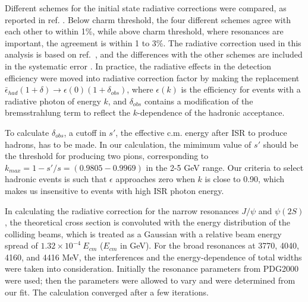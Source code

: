  
Different schemes for the initial state radiative corrections
were compared\cite{berends,fmartin,fadin,crystalball},
as reported in ref. \cite{besr_1}. Below charm threshold, 
the four different
schemes agree with each other to within 1\%, while
above charm threshold, where resonances are
important, the agreement is within 1 to 3\%.  
The radiative correction used in this analysis is based on 
ref.~\cite{crystalball},
and the differences with the other schemes are included in the
systematic error \cite{comment}.
In practice, the radiative effects in the detection efficiency
were moved into radiative correction factor by making the
replacement $\bar\epsilon_{had}(1+\delta) \to \epsilon(0) 
(1+\delta_{obs})$, where 
$\epsilon(k)$ is the efficiency
for events with a radiative photon of energy $k$, and 
$\delta_{obs}$ contains a modification of the bremsstrahlung
term to reflect the $k$-dependence of the hadronic acceptance.

To calculate $\delta_{obs}$, %
a cutoff in 
$s'$, the effective c.m. energy after ISR to produce hadrons, 
has to be made. In our calculation, the mimimum value of $s'$
should be the threshold for producing two pions, corresponding to
$k_{max}=1-s'/s=(0.9805-0.9969)$ in the 2-5 GeV range.
Our criteria to select hadronic events is such that $\epsilon$ 
approaches zero when $k$ is close to 0.90, which makes us 
insensitive to events with high ISR photon energy. 

In calculating the radiative correction for the narrow resonances
$J/\psi$ and $\psi(2S)$, the theoretical cross 
section is convoluted %
with the energy distribution of the 
colliding beams, which is treated as a Gaussian with 
a relative beam energy spread of $1.32 \times 10^{-4}~E_{cm}$ ($E_{cm}$ in GeV).
For the broad resonances 
at 3770, 4040, 4160, and 4416 MeV, the interferences and the 
energy-dependence of total widths were taken into consideration.
Initially
the resonance parameters from PDG2000~\cite{PDG2k} were used;
then the parameters were allowed to vary and were
determined from our fit. The calculation converged after a few
iterations. 

